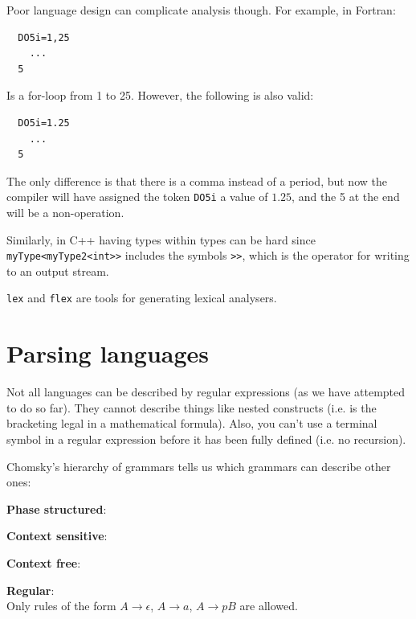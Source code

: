 Poor language design can complicate analysis though. For example, in Fortran:

\begin{verbatim}
  DO5i=1,25
    ...
  5
\end{verbatim}

Is a for-loop from 1 to 25. However, the following is also valid:

\begin{verbatim}
  DO5i=1.25
    ...
  5
\end{verbatim}


The only difference is that there is a comma instead of a period, but now the
compiler will have assigned the token \texttt{DO5i} a value of $1.25$, and the 5
at the end will be a non-operation.

Similarly, in C++ having types within types can be hard since
\texttt{myType<myType2<int>>} includes the symbols \texttt{>>}, which is the
operator for writing to an output stream.

\texttt{lex} and \texttt{flex} are tools for generating lexical analysers.




\section{Parsing languages}

Not all languages can be described by regular expressions (as we have attempted
to do so far). They cannot describe things like nested constructs (i.e. is the
bracketing legal in a mathematical formula). Also, you can't use a terminal
symbol in a regular expression before it has been fully defined (i.e. no
recursion).

Chomsky's hierarchy of grammars tells us which grammars can describe other ones:

\begin{description}
  \item \textbf{Phase structured}: %
  \item \textbf{Context sensitive}: %
  \item \textbf{Context free}: %
  \item \textbf{Regular}:\\
    Only rules of the form $A \rightarrow \epsilon$, $A \rightarrow a$,
    $A \rightarrow pB$ are allowed.  %
\end{description}

